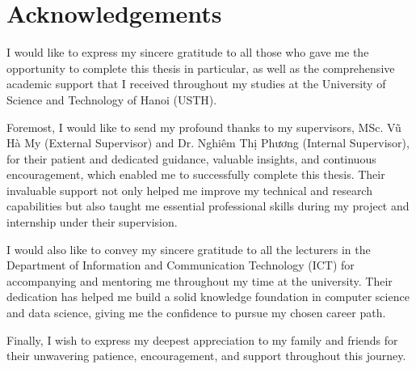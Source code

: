 \chapter*{Acknowledgements}

I would like to express my sincere gratitude to all those who gave me the opportunity to complete this thesis in particular, as well as the comprehensive academic support that I received throughout my studies at the University of Science and Technology of Hanoi (USTH).

Foremost, I would like to send my profound thanks to my supervisors, MSc. Vũ Hà My (External Supervisor) and Dr. Nghiêm Thị Phương (Internal Supervisor), for their patient and dedicated guidance, valuable insights, and continuous encouragement, which enabled me to successfully complete this thesis. Their invaluable support not only helped me improve my technical and research capabilities but also taught me essential professional skills during my project and internship under their supervision.

I would also like to convey my sincere gratitude to all the lecturers in the Department of Information and Communication Technology (ICT) for accompanying and mentoring me throughout my time at the university. Their dedication has helped me build a solid knowledge foundation in computer science and data science, giving me the confidence to pursue my chosen career path.

Finally, I wish to express my deepest appreciation to my family and friends for their unwavering patience, encouragement, and support throughout this journey.
